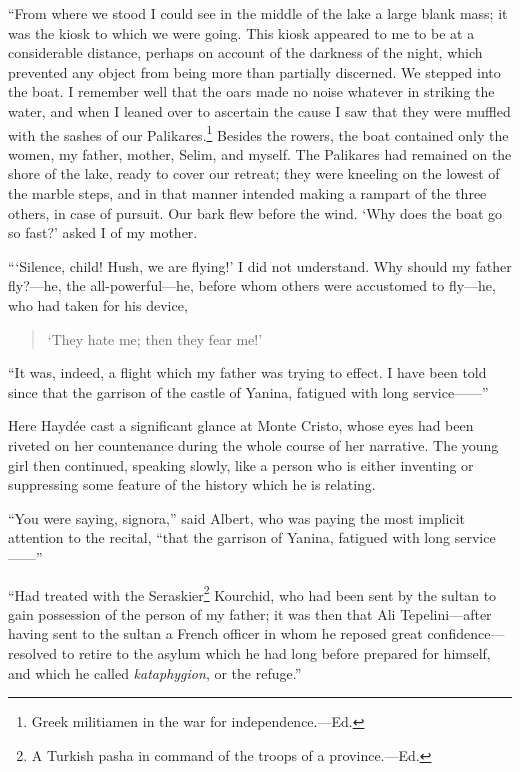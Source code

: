 “From where we stood I could see in the middle of the lake a large
blank mass; it was the kiosk to which we were going. This kiosk
appeared to me to be at a considerable distance, perhaps on account of
the darkness of the night, which prevented any object from being more
than partially discerned. We stepped into the boat. I remember well
that the oars made no noise whatever in striking the water, and when I
leaned over to ascertain the cause I saw that they were muffled with
the sashes of our Palikares.\footnote[14]{Greek militiamen in the war
for independence.—Ed.} Besides the rowers, the boat contained
only the women, my father, mother, Selim, and myself. The Palikares had
remained on the shore of the lake, ready to cover our retreat; they
were kneeling on the lowest of the marble steps, and in that manner
intended making a rampart of the three others, in case of pursuit. Our
bark flew before the wind. ‘Why does the boat go so fast?’ asked I of
my mother.

“‘Silence, child! Hush, we are flying!’ I did not understand. Why
should my father fly?—he, the all-powerful—he, before whom others were
accustomed to fly—he, who had taken for his device,

\begin{quote}
{\small‘They hate me; then they fear me!’}
\end{quote}

“It was, indeed, a flight which my father was trying to effect. I have
been told since that the garrison of the castle of Yanina, fatigued
with long service——”

Here Haydée cast a significant glance at Monte Cristo, whose eyes had
been riveted on her countenance during the whole course of her
narrative. The young girl then continued, speaking slowly, like a
person who is either inventing or suppressing some feature of the
history which he is relating.

“You were saying, signora,” said Albert, who was paying the most
implicit attention to the recital, “that the garrison of Yanina,
fatigued with long service——”

“Had treated with the Seraskier\footnote[15]{A Turkish pasha in command
of the troops of a province.—Ed.} Kourchid, who had been sent by the
sultan to gain possession of the person of my father; it was then that
Ali Tepelini—after having sent to the sultan a French officer in whom
he reposed great confidence—resolved to retire to the asylum which he
had long before prepared for himself, and which he called
\textit{kataphygion}, or the refuge.”

